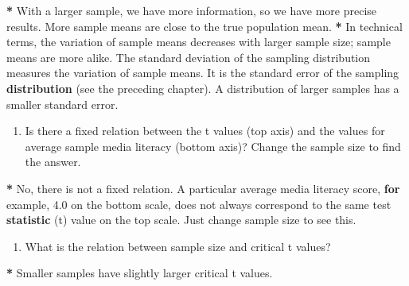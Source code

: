 \documentclass[a4paper]{book}
\newenvironment{Shaded}{\begin{snugshade}}{\end{snugshade}}
\newcommand{\KeywordTok}[1]{\textcolor[rgb]{0,0,0}{\textbf{#1}}}
\newcommand{\FloatTok}[1]{\textcolor[rgb]{0.00,0.00,0.00}{#1}}
\newcommand{\StringTok}[1]{\textcolor[rgb]{0.00,0.00,0.00}{#1}}
\newcommand{\ControlFlowTok}[1]{\textcolor[rgb]{0.00,0.00,0.00}{\textbf{#1}}}
\newcommand{\OperatorTok}[1]{\textcolor[rgb]{0.00,0.00,0.00}{\textbf{#1}}}
\newcommand{\NormalTok}[1]{#1}
\providecommand{\tightlist}{%
  \setlength{\itemsep}{0pt}\setlength{\parskip}{0pt}}
\theoremstyle{definition}
\theoremstyle{definition}
\theoremstyle{definition}
\theoremstyle{remark}
\begin{document}
\begin{Shaded}
\begin{Highlighting}[]
\OperatorTok{*}\StringTok{ }\NormalTok{With a larger sample, we have more information, so we have more precise}
\NormalTok{results. More sample means are close to the true population mean.}
\OperatorTok{*}\StringTok{ }\NormalTok{In technical terms, the variation of sample means decreases with larger}
\NormalTok{sample size; sample means are more alike. The standard deviation of the}
\NormalTok{sampling distribution measures the variation of sample means. It is the}
\NormalTok{standard error of the sampling }\KeywordTok{distribution}\NormalTok{ (see the preceding chapter). A}
\NormalTok{distribution of larger samples has a smaller standard error.}
\end{Highlighting}
\end{Shaded}

\begin{enumerate}
\def\labelenumi{\arabic{enumi}.}
\setcounter{enumi}{3}
\tightlist
\item
  Is there a fixed relation between the t values (top axis) and the
  values for average sample media literacy (bottom axis)? Change the
  sample size to find the answer.
\end{enumerate}

\begin{Shaded}
\begin{Highlighting}[]
\OperatorTok{*}\StringTok{ }\NormalTok{No, there is not a fixed relation. A particular average media literacy}
\NormalTok{score, }\ControlFlowTok{for}\NormalTok{ example, }\FloatTok{4.0}\NormalTok{ on the bottom scale, does not always correspond to the}
\NormalTok{same test }\KeywordTok{statistic}\NormalTok{ (t) value on the top scale. Just change sample size to see}
\NormalTok{this.}
\end{Highlighting}
\end{Shaded}

\begin{enumerate}
\def\labelenumi{\arabic{enumi}.}
\setcounter{enumi}{4}
\tightlist
\item
  What is the relation between sample size and critical t values?
\end{enumerate}

\begin{Shaded}
\begin{Highlighting}[]
\OperatorTok{*}\StringTok{ }\NormalTok{Smaller samples have slightly larger critical t values.}
\end{Highlighting}
\end{Shaded}
\end{document}
